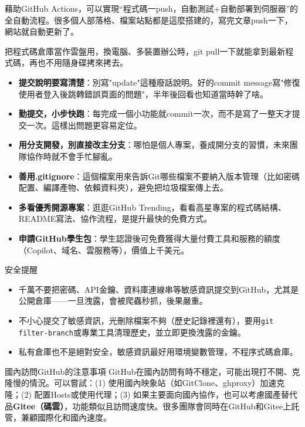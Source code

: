 藉助GitHub Actions，可以實現“程式碼一push，自動測試+自動部署到伺服器”的全自動流程。很多個人部落格、檔案站點都是這麼搭建的，寫完文章push一下，網站就自動更新了。


把程式碼倉庫當作雲盤用，換電腦、多裝置辦公時，git pull一下就能拿到最新程式碼，再也不用隨身碟拷來拷去。


\begin{itemize}
  \item \textbf{提交說明要寫清楚}：別寫"update"這種廢話說明。好的commit message寫"修復使用者登入後跳轉錯誤頁面的問題"，半年後回看也知道當時幹了啥。
  \item \textbf{勤提交，小步快跑}：每完成一個小功能就commit一次，而不是寫了一整天才提交一次。這樣出問題更容易定位。
  \item \textbf{用分支開發，別直接改主分支}：哪怕是個人專案，養成開分支的習慣，未來團隊協作時就不會手忙腳亂。
  \item \textbf{善用.gitignore}：這個檔案用來告訴Git哪些檔案不要納入版本管理（比如密碼配置、編譯產物、依賴資料夾），避免把垃圾檔案傳上去。
  \item \textbf{多看優秀開源專案}：逛逛GitHub Trending，看看高星專案的程式碼結構、README寫法、協作流程，是提升最快的免費方式。
  \item \textbf{申請GitHub學生包}：學生認證後可免費獲得大量付費工具和服務的額度（Copilot、域名、雲服務等），價值上千美元。
\end{itemize}

\begin{tcbwarn}{安全提醒}
\begin{itemize}
  \item 千萬不要把密碼、API金鑰、資料庫連線串等敏感資訊提交到GitHub，尤其是公開倉庫——一旦洩露，會被爬蟲秒抓，後果嚴重。
  \item 不小心提交了敏感資訊，光刪除檔案不夠（歷史記錄裡還有），要用\texttt{git filter-\allowbreak branch}或專業工具清理歷史，並立即更換洩露的金鑰。
  \item 私有倉庫也不是絕對安全，敏感資訊最好用環境變數管理，不程序式碼倉庫。
\end{itemize}

\end{tcbwarn}

\begin{tcbinfo}{國內訪問GitHub的注意事項}
GitHub在國內訪問有時不穩定，可能出現打不開、克隆慢的情況。可以嘗試：(1) 使用國內映象站（如GitClone、ghproxy）加速克隆；(2) 配置Hosts或使用代理；(3) 如果主要面向國內協作，也可以考慮國產替代品\textbf{Gitee（碼雲）}，功能類似且訪問速度快。很多團隊會同時在GitHub和Gitee上託管，兼顧國際化和國內速度。

\end{tcbinfo}

